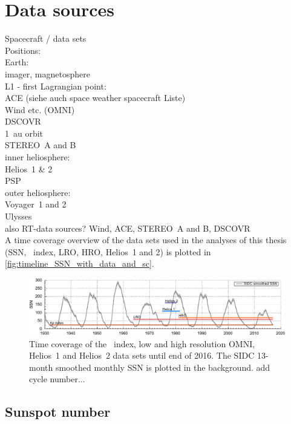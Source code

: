 \section{Data sources}

Spacecraft / data sets\\

Positions:\\
Earth:\\
	imager, magnetosphere\\
L1 - first Lagrangian point:\\
	ACE (siehe auch space weather spacecraft Liste)\\
	Wind etc. (OMNI)\\
	DSCOVR\\
1~au orbit\\
	STEREO~A and B\\
inner heliosphere:\\
	Helios~1 \& 2\\
	PSP\\
outer heliosphere:\\
	Voyager~1 and 2\\
	Ulysses\\

also RT-data sources? Wind, ACE, STEREO~A and B, DSCOVR\\

A time coverage overview of the data sets used in the analyses of this thesis (SSN, \Kp~index, LRO, HRO, Helios~1 and 2) is plotted in \autoref{fig:timeline_SSN_with_data_and_sc}.\\
\begin{figure}[htb]
	\centering
	\includegraphics[width=\textwidth]{images/gnuplots/timeline_SSN_with_data_and_sc.pdf}
	\caption{Time coverage of the \Kp~index, low and high resolution OMNI, Helios~1 and Helios~2 data sets until end of 2016. The SIDC 13-month smoothed monthly SSN is plotted in the background. add cycle number...}
	\label{fig:timeline_SSN_with_data_and_sc}
\end{figure}


\subsection{Sunspot number}

